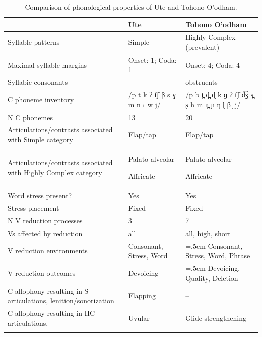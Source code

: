 \begin{table}
\small
\begin{tabularx}{\textwidth}{IQQ}
\lsptoprule
 & {Ute} & {Tohono O’odham}\\
 \midrule
 {Syllable patterns} & Simple & Highly Complex (prevalent)\\
 \tablevspace 
 {Maximal syllable margins} & Onset: 1; Coda: 1 & Onset: 4; Coda: 4\\
 \tablevspace 
 {Syllabic consonants} & -- & obstruents\\
 \tablevspace 
 {C phoneme inventory} & /p t k ʔ t͡ʃ β s ɣ m n ɾ w j/ & /p b t̪ d̪ ɖ k ɡ ʔ t͡ʃ d͡ʒ s̪ ʂ h m n̪ ɲ ŋ ɭ β ̞ j/\\
 \tablevspace 
 {N C phonemes} & 13 & 20\\
 \tablevspace 
 {Articulations/contrasts associated with {Simple}} {category} & {Flap/tap} & {Flap/tap}\\
 \tablevspace 
 {Articulations/contrasts associated with {Highly Complex}} {category} & { {Palato-alveolar}} 
 
 Affricate& { {Palato-alveolar}}
 
 Affricate\\
 \tablevspace 
 {Word stress present?} & {Yes} & {Yes}\\
 \tablevspace 
 {Stress placement} & {Fixed} & {Fixed}\\
 \tablevspace 
 {N V reduction processes} & {3} & {7}\\
 \tablevspace 
 {Vs affected by reduction}  & {all} & {all, high, short}\\
 \tablevspace 
 {V reduction environments} & {Consonant, Stress, Word} &\hangindent=.5em Consonant, Stress, Word, Phrase\\
 \tablevspace 
 {V reduction outcomes} & {Devoicing} &\hangindent=.5em Devoicing, Quality, Deletion\\
 \tablevspace 
 {C allophony resulting in S articulations, lenition/sonorization} & {{Flapping}} & {--}\\
\tablevspace 
 {{C allophony resulting in HC articulations,} } & {{Uvular}} & {Glide strengthening}\\
\lspbottomrule
\end{tabularx}
\caption{\label{tab:8.2}Comparison of phonological properties of Ute and Tohono O’odham.}
\end{table}

